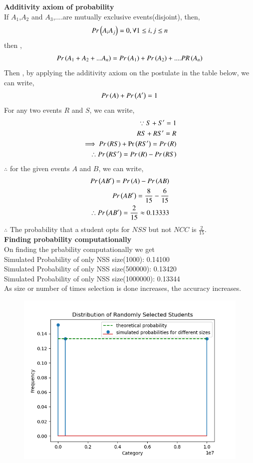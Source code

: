 \documentclass[journal]{IEEEtran}
\begin{document}
\textbf{Additivity axiom of probability}
\\
If $A_1$,$A_2$ and $A_3$,....are mutually exclusive events(disjoint), then,
\begin{align}
    Pr\left(A_iA_j\right) = 0, \forall  1 \leq i,j \leq n
\end{align}
then ,
\begin{align}
    Pr\left(A_1+A_2+...A_n\right) = Pr\left(A_1\right) + Pr\left(A_2\right) + ....PR\left(A_n\right) 
\end{align}
Then , by applying the additivity axiom on the postulate  in the table below, we can write,
\begin{align}
    Pr\left(A\right) + Pr\left(A^\prime\right) = 1
\end{align}
For any two events $R$ and $S$, we can write,
\begin{align}
    \because S + S^\prime = 1\\
    RS + RS^\prime = R\\
    \implies Pr\left(RS\right) + \Pr\left(RS^\prime\right) = Pr\left(R\right)\\
    \therefore Pr\left(RS^\prime\right) = Pr\left(R\right) - Pr\left(RS\right)
\end{align}
$\therefore$ for the given events $A$ and $B$, we can write,
\begin{align}
Pr\left(AB^\prime\right) = Pr\left(A\right) - Pr\left(AB\right)\\
    Pr\left(AB^\prime\right) = \frac{8}{15} - \frac{6}{15}\\
    \therefore Pr\left(AB^\prime\right) = \frac{2}{15} \approx 0.13333
\end{align}
$\therefore$ The probability that a student opts for $NSS$ but not $NCC$ is $\frac{2}{15}$.\\
\textbf{Finding probability computationally}
\\
On finding the prbability computationally we get\\
Simulated Probability of only  NSS size(1000): 0.14100\\
Simulated Probability of only  NSS size(500000): 0.13420\\
Simulated Probability of only  NSS size(1000000): 0.13344\\
As size or number of times selection is done increases, the accuracy increases.

\begin{figure}[h!]
   \centering
   \includegraphics[width=1\columnwidth]{figures/Figure_1.png}
   \label{graph of the function}
\end{figure}
\end{document}
